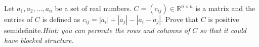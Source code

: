 \documentclass[a4paper]{article}
\begin{document}
Let $a_1, a_2, \ldots, a_n$ be a set of real numbers.
$C=(c_{ij})\in \mathbb{R}^{n\times n}$ is a matrix and the entries of $C$
is defined as $c_{ij}=|a_i|+|a_j|-|a_i-a_j|$. Prove that $C$ is positive
semidefinite.\emph{Hint: you can permute the rows and columns of $C$ so
that it could have blocked structure.}
\end{document}
